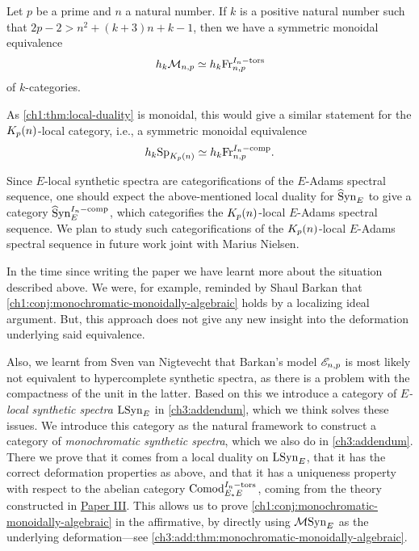 \begin{conjecture}
    \label{ch1:conj:monochromatic-monoidally-algebraic}
    Let $p$ be a prime and $n$ a natural number. If $k$ is a positive natural number such that $2p-2>n^2+(k+3)n+k-1$, then we have a symmetric monoidal equivalence 
    \[h_k \mathcal{M}_{n,p}\simeq h_k \mathrm{Fr}_{n,p}^{I_n-\mathrm{tors}}\]
    of $k$-categories. 
\end{conjecture}



As \cref{ch1:thm:local-duality} is monoidal, this would give a similar statement for the ${K_p(n)}$-local category, i.e., a symmetric monoidal equivalence 
\[h_k \mathrm{Sp}_{{K_p(n)}}\simeq h_k \mathrm{Fr}_{n,p}^{I_n-\mathrm{comp}}.\]

Since $E$-local synthetic spectra are categorifications of the $E$-Adams spectral sequence, one should expect the above-mentioned local duality for $\widehat{\mathrm{S}}\mathrm{yn}_{E}$ to give a category $\widehat{\mathrm{S}}\mathrm{yn}_{E}^{I_n-\mathrm{comp}}$, which categorifies the ${K_p(n)}$-local $E$-Adams spectral sequence. We plan to study such categorifications of the ${K_p(n)}$-local $E$-Adams spectral sequence in future work joint with Marius Nielsen. 

\begin{addendum}
    \label{ch1:add:shaul-comment-monoidal}
    In the time since writing the paper we have learnt more about the situation described above. We were, for example, reminded by Shaul Barkan that \cref{ch1:conj:monochromatic-monoidally-algebraic} holds by a localizing ideal argument. But, this approach does not give any new insight into the deformation underlying said equivalence. 
    
    Also, we learnt from Sven van Nigtevecht that Barkan's model $\mathscr{E}_{n,p}$ is most likely not equivalent to hypercomplete synthetic spectra, as there is a problem with the compactness of the unit in the latter. Based on this we introduce a category of \emph{$E$-local synthetic spectra} $\mathrm{LSyn}_{E}$ in \cref{ch3:addendum}, which we think solves these issues. We introduce this category as the natural framework to construct a category of \emph{monochromatic synthetic spectra}, which we also do in \cref{ch3:addendum}. There we prove that it comes from a local duality on $\mathrm{LSyn}_{E}$, that it has the correct deformation properties as above, and that it has a uniqueness property with respect to the abelian category $\mathrm{Comod}_{E_*E}^{I_n-\mathrm{tors}}$, coming from the theory constructed in \hyperref[ch3]{Paper III}. This allows us to prove \cref{ch1:conj:monochromatic-monoidally-algebraic} in the affirmative, by directly using $\mathcal{M}\mathrm{Syn}_{E}$ as the underlying deformation---see \cref{ch3:add:thm:monochromatic-monoidally-algebraic}. 
\end{addendum}


